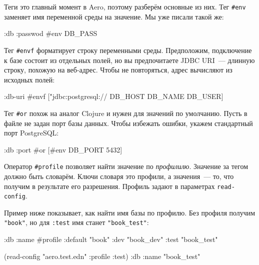 Теги это главный момент в Aero, поэтому разберём основные из них. Тег
\verb|#env| заменяет имя переменной среды на значение. Мы уже писали такой
же:

\begin{english}
  \begin{clojure}
{:db {:passwod #env DB_PASS}}
  \end{clojure}
\end{english}

Тег \verb|#envf| форматирует строку переменными среды. Предположим,
подключение к базе состоит из отдельных полей, но вы предпочитаете JDBC URI~---
длинную строку, похожую на веб-адрес. Чтобы не повторяться, адрес вычисляют из
исходных полей:

\begin{english}
  \begin{clojure}
{:db-uri #envf ["jdbc:postgresql://%
                DB_HOST DB_NAME DB_USER]}
  \end{clojure}
\end{english}

Тег \verb|#or| похож на аналог Clojure и нужен для значений по
умолчанию. Пусть в файле не задан порт базы данных. Чтобы избежать ошибки,
укажем стандартный порт PostgreSQL:

\begin{english}
  \begin{clojure}
{:db {:port #or [#env DB_PORT 5432]}}
  \end{clojure}
\end{english}


Оператор \verb|#profile| позволяет найти значение по
\emph{профилилю}. Значение за тегом должно быть словарём. Ключи словаря это
профили, а значения~--- то, что получим в результате его разрешения. Профиль
задают в параметрах \verb|read-config|.

Пример ниже показывает, как найти имя базы по профилю. Без профиля получим
\verb|"book"|, но для \verb|:test| имя станет \verb|"book_test"|:

\begin{english}
  \begin{clojure}
{:db {:name #profile {:default "book"
                      :dev     "book_dev"
                      :test    "book_test"}}}

(read-config "aero.test.edn" {:profile :test})
{:db {:name "book_test"}}
  \end{clojure}
\end{english}

